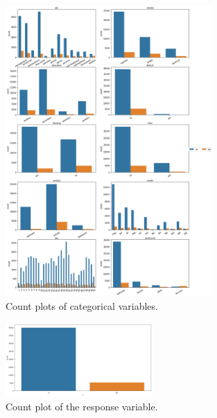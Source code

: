 \documentclass[]{article}
\begin{document}
\begin{figure}
  \centering
    \includegraphics[width=0.7\textwidth]{images/fig3.png}
  \caption{Count plots of categorical variables.}
  \label{fig3}
\end{figure}

\begin{figure}
  \centering
    \includegraphics[width=0.5\textwidth]{images/fig4.png}
  \caption{Count plot of the response variable.}
  \label{fig4}
\end{figure}
\end{document}

